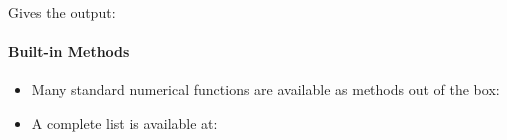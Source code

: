 \documentclass[letterpaper,10pt,english,openany]{sphinxmanual}
\begin{document}
Gives the output:

\begin{sphinxVerbatim}[commandchars=\\\{\}]
[20 29 38 47]
\end{sphinxVerbatim}


\paragraph{Built-in Methods}
\label{\detokenize{introduction_to_python/using_modules:built-in-methods}}\begin{itemize}
\item {} 
Many standard numerical functions are available as methods out of the
box:

\end{itemize}

\begin{sphinxVerbatim}[commandchars=\\\{\}]
  \PYG{p}{[}\PYG{p}{]}
  
  
  
\end{sphinxVerbatim}
\begin{itemize}
\item {} 
A complete list is available at:

\end{itemize}
\end{document}
